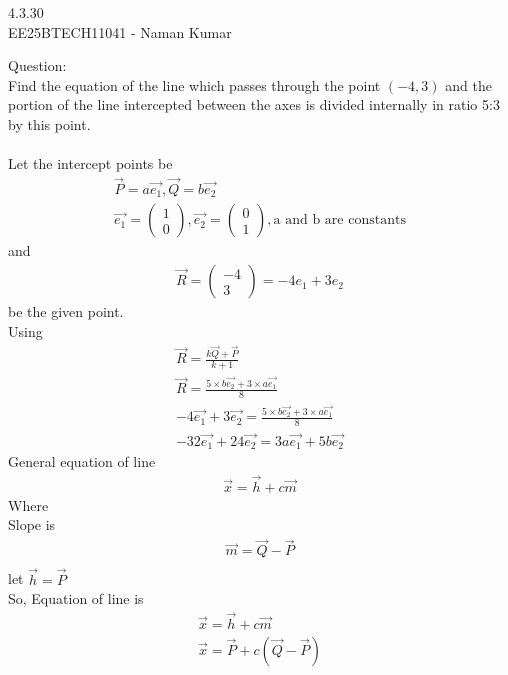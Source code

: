 \documentclass[journal]{IEEEtran}
\author{EE25BTECH11041-Naman Kumar }
\begin{document}
\begin{center}
    \huge{4.3.30}\\
    \large{EE25BTECH11041 - Naman Kumar}
\end{center}
Question:\\
Find the equation of the line which passes through the point $(-4, 3)$ and the portion of the line intercepted between the axes is divided internally in ratio 5:3 by this point.\\
\solution \\
Let the intercept points be
\begin{align}
    \vec{P}=a\vec{e_1},\vec{Q}=b\vec{e_2} \\\vec{e_1}=\begin{pmatrix}1\\0\end{pmatrix}, \vec{e_2}=\begin{pmatrix}0\\1\end{pmatrix}, \text{a and b are constants}
\end{align}
and
\begin{align}
    \vec{R}=\begin{pmatrix}-4\\3\end{pmatrix}=-4e_1+3e_2
\end{align}
be the given point.\\
Using
\begin{align}
    \vec{R}=\frac{k\vec{Q}+\vec{P}}{k+1} \label{section}\\
    \vec{R}=\frac{5\times b\vec{e_2}+3\times a\vec{e_1}}{8}\\
    -4\vec{e_1}+3\vec{e_2}=\frac{5\times b\vec{e_2}+3\times a\vec{e_1}}{8}\\
    -32\vec{e_1}+24\vec{e_2}=3a\vec{e_1}+5b\vec{e_2} \label{points}
\end{align}
General equation of line
\begin{align}
    \vec{x}=\vec{h}+c\vec{m}
\end{align}
Where\\

\newpage
Slope is
\begin{align}
\vec{m}=\vec{Q}-\vec{P}\\
\end{align}
let $\vec{h}=\vec{P}$\\
So, Equation of line is
\begin{align}
    \vec{x}=\vec{h}+c\vec{m}\\
    \vec{x}=\vec{P}+c(\vec{Q}-\vec{P})
\end{align}
\end{document}
